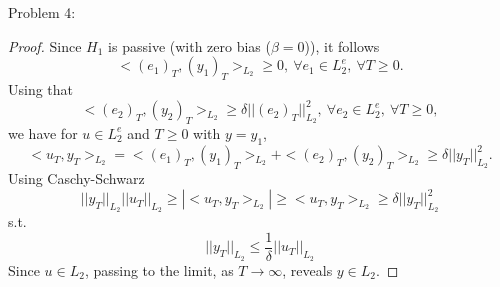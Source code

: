 Problem 4:
\begin{proof}
    Since $H_1$ is passive (with zero bias ($\beta = 0$)), it follows
    $$<(e_1)_T,(y_1)_T>_{L_2} \ge 0, \ \forall e_1 \in L_2^e, \ \forall T \ge 0.$$
    Using that
     $$<(e_2)_T,(y_2)_T>_{L_2} \ge \delta ||(e_2)_T||^2_{L_2}, \ \forall e_2 \in L_2^e, \ \forall T \ge 0,$$
    we have for $u \in L_2^e$ and $T \ge 0$ with $y=y_1$,
    $$<u_T,y_T>_{L_2} = <(e_1)_T,(y_1)_T>_{L_2} + <(e_2)_T,(y_2)_T>_{L_2} \ge \delta ||y_T||^2_{L_2}.$$
    Using Caschy-Schwarz
    $$||y_T||_{L_2}||u_T||_{L_2} \ge |<u_T,y_T>_{L_2}| \ge <u_T,y_T>_{L_2} \ge \delta ||y_T||^2_{L_2}$$
    s.t.
    $$||y_T||_{L_2} \le \frac{1}{\delta}||u_T||_{L_2}$$
    Since $u \in L_2$, passing to the limit, as $T \rightarrow \infty$, reveals $y \in L_2$.
\end{proof}
